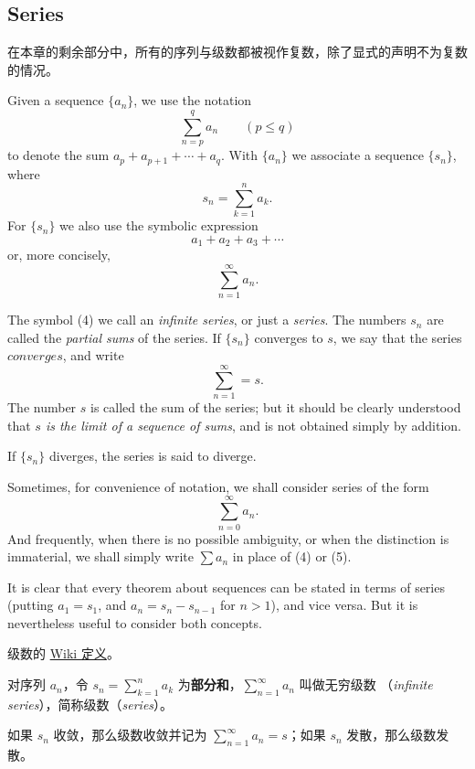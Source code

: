 \documentclass[../poma-notes.tex]{subfiles}
\begin{document}
\subsection*{Series}

在本章的剩余部分中，所有的序列与级数都被视作复数，除了显式的声明不为复数的情况。

\begin{definition}
  Given a sequence $\{a_n\}$, we use the notation
  \[ \sum_{n=p}^{q} a_n \qquad (p \le q) \]
  to denote the sum $ a_p + a_{p+1} + \cdots + a_q$. With $\{a_n\}$ we associate a sequence $\{s_n\}$, where
  \[ s_n = \sum_{k=1}^{n} a_k. \]
  For $\{s_n\}$ we also use the symbolic expression
  \[ a_1 + a_2 + a_3 + \cdots \]
  or, more concisely,
  \begin{equation}
    \sum_{n=1}^{\infty} a_n.
  \end{equation}

  The symbol (4) we call an \textit{infinite series}, or just a \textit{series}. The numbers $s_n$ are called
  the \textit{partial sums} of the series. If $\{s_n\}$ converges to $s$, we say that the series $converges$,
  and write
  \[ \sum_{n=1}^{\infty} = s. \]
  The number $s$ is called the sum of the series; but it should be clearly understood that \textit{$s$ is the
    limit of a sequence of sums}, and is not obtained simply by addition.

  If $\{s_n\}$ diverges, the series is said to diverge.

  Sometimes, for convenience of notation, we shall consider series of the form
  \begin{equation}
    \sum_{n=0}^{\infty} a_n.
  \end{equation}
  And frequently, when there is no possible ambiguity, or when the distinction is immaterial, we shall simply
  write $\sum a_n$ in place of (4) or (5).

  It is clear that every theorem about sequences can be stated in terms of series (putting $a_1 = s_1$, and
  $a_n = s_n - s_{n-1}$ for $n > 1$), and vice versa. But it is nevertheless useful to consider both concepts.
\end{definition}

\anote 级数的 \href{https://en.wikipedia.org/wiki/Series_(mathematics)}{Wiki 定义}。

\begin{anote}\mbox{}\par
  对序列 $a_n$，令 $s_n = \sum_{k=1}^{n} a_k$ 为\textbf{部分和}，$\sum_{n=1}^{\infty} a_n$ 叫做无穷级数
  （\textit{infinite series}），简称级数（\textit{series}）。

  如果 $s_n$ 收敛，那么级数收敛并记为 $\sum_{n=1}^{\infty} a_n = s$；如果 $s_n$ 发散，那么级数发散。
\end{anote}
\end{document}
